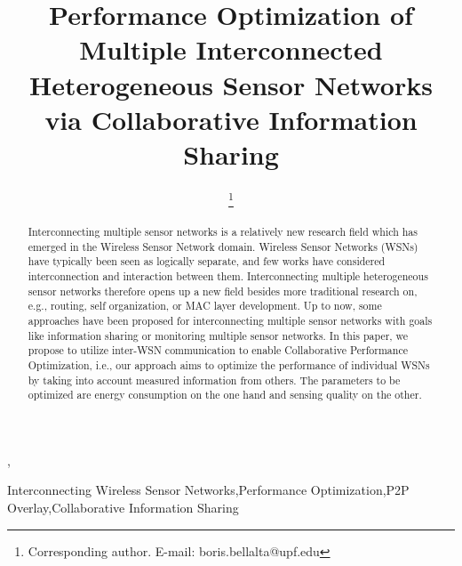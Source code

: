 \documentclass[onecolumn]{jaise2e}
\begin{document}
\twocolumn

\begin{frontmatter}

\title{Performance Optimization of Multiple Interconnected Heterogeneous Sensor Networks via Collaborative Information Sharing}




\author[A]{ },
\author[A]{ }
\author[A]{ \thanks{Corresponding author. E-mail: boris.bellalta@upf.edu}}
\author[A]{ }
\address[A]{Department of Information and Communication Technologies. Universitat Pompeu Fabra, Barcelona. e-mail:\{name.surname\}@upf.edu}

\maketitle


\begin{abstract}
Interconnecting multiple sensor networks is a relatively new research field which has emerged in the Wireless Sensor Network domain. Wireless Sensor Networks (WSNs) have typically been seen as logically separate, and few works have considered interconnection and interaction between them. Interconnecting multiple heterogeneous sensor networks therefore opens up a new field besides more traditional research on, e.g., routing, self organization, or MAC layer development. Up to now, some approaches have been proposed for interconnecting multiple sensor networks with goals like information sharing or monitoring multiple sensor networks. In this paper, we propose to utilize inter-WSN communication to enable Collaborative Performance Optimization, i.e., our approach aims to optimize the performance of individual WSNs by taking into account measured information from others. The parameters to be optimized are energy consumption on the one hand and sensing quality on the other.
\end{abstract}

\begin{keyword}
 Interconnecting Wireless Sensor Networks\sep Performance Optimization\sep P2P Overlay\sep Collaborative Information Sharing
\end{keyword}

\end{frontmatter}
\end{document}

